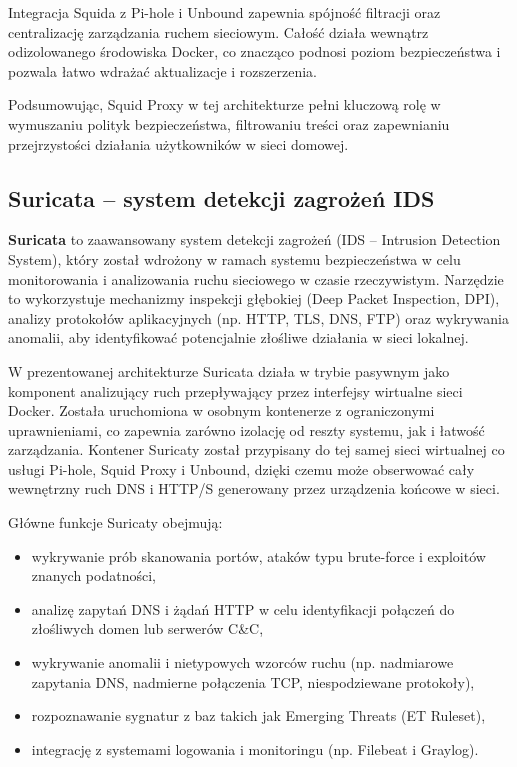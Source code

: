 \documentclass[
    left=2.5cm,         %
    right=2.5cm,        %
    top=2.5cm,          %
    bottom=3cm,         %
    bindingoffset=6mm,  %
    nohyphenation=true %
]{eiti/eiti-thesis} %
\begin{document}
Integracja Squida z Pi-hole i Unbound zapewnia spójność filtracji oraz centralizację zarządzania ruchem sieciowym. Całość działa wewnątrz odizolowanego środowiska Docker, co znacząco podnosi poziom bezpieczeństwa i pozwala łatwo wdrażać aktualizacje i rozszerzenia.

Podsumowując, Squid Proxy w tej architekturze pełni kluczową rolę w wymuszaniu polityk bezpieczeństwa, filtrowaniu treści oraz zapewnianiu przejrzystości działania użytkowników w sieci domowej.

\subsection{Suricata – system detekcji zagrożeń IDS}

\textbf{Suricata}\cite{suricata-wiki} to zaawansowany system detekcji zagrożeń (IDS – Intrusion Detection System), który został wdrożony w ramach systemu bezpieczeństwa w celu monitorowania i analizowania ruchu sieciowego w czasie rzeczywistym. Narzędzie to wykorzystuje mechanizmy inspekcji głębokiej (Deep Packet Inspection, DPI), analizy protokołów aplikacyjnych (np. HTTP, TLS, DNS, FTP) oraz wykrywania anomalii, aby identyfikować potencjalnie złośliwe działania w sieci lokalnej\cite{suricata-docs}.

W prezentowanej architekturze Suricata działa w trybie pasywnym jako komponent analizujący ruch przepływający przez interfejsy wirtualne sieci Docker\cite{config-suricata}. Została uruchomiona w osobnym kontenerze z ograniczonymi uprawnieniami, co zapewnia zarówno izolację od reszty systemu, jak i łatwość zarządzania. Kontener Suricaty został przypisany do tej samej sieci wirtualnej co usługi Pi-hole, Squid Proxy i Unbound, dzięki czemu może obserwować cały wewnętrzny ruch DNS i HTTP/S generowany przez urządzenia końcowe w sieci\cite{suricata-docs}.

Główne funkcje Suricaty obejmują:
\begin{itemize}
    \item wykrywanie prób skanowania portów, ataków typu brute-force i exploitów znanych podatności,
    \item analizę zapytań DNS i żądań HTTP w celu identyfikacji połączeń do złośliwych domen lub serwerów C\&C,
    \item wykrywanie anomalii i nietypowych wzorców ruchu (np. nadmiarowe zapytania DNS, nadmierne połączenia TCP, niespodziewane protokoły),
    \item rozpoznawanie sygnatur z baz takich jak Emerging Threats (ET Ruleset),
    \item integrację z systemami logowania i monitoringu (np. Filebeat i Graylog).
\end{itemize}
\end{document}
